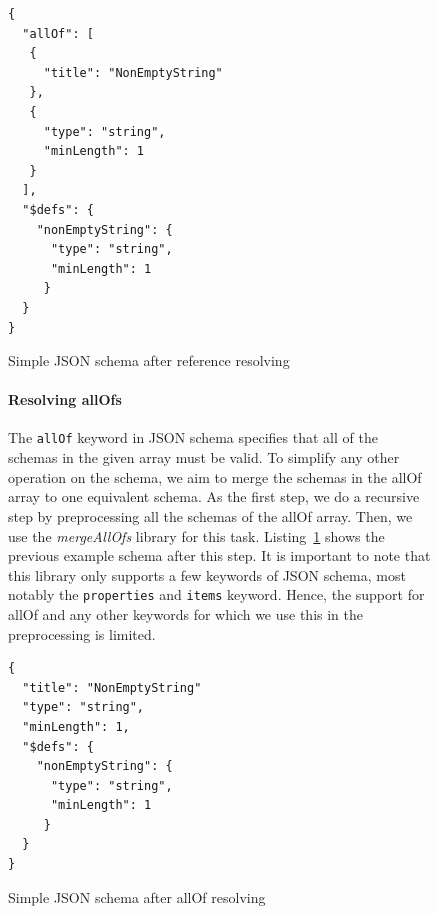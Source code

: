 \begin{figure}[h]
\begin{listing}[!h]
    \begin{verbatim}
{
  "allOf": [
   {
     "title": "NonEmptyString"
   },
   {
     "type": "string",
     "minLength": 1
   }
  ],
  "$defs": {
    "nonEmptyString": {
      "type": "string",
      "minLength": 1
     }
  }
}
    \end{verbatim}
    \caption{Simple JSON schema after reference resolving}
    \label{listing:reference-resolving}
\end{listing}

\paragraph{Resolving allOfs}

The \texttt{allOf} keyword in JSON schema specifies that all of the schemas in the given array must be valid.
To simplify any other operation on the schema, we aim to merge the schemas in the allOf array to one equivalent schema.
As the first step, we do a recursive step by preprocessing all the schemas of the allOf array.
Then, we use the \textit{mergeAllOfs} library %
for this task.
Listing~\ref{listing:resolved-allOf} shows the previous example schema after this step.
It is important to note that this library only supports a few keywords of JSON schema, most notably the
\texttt{properties} and \texttt{items} keyword.
Hence, the support for allOf and any other keywords for which we use this in the preprocessing is limited.

\begin{listing}[h]
    \begin{verbatim}
{
  "title": "NonEmptyString"
  "type": "string",
  "minLength": 1,
  "$defs": {
    "nonEmptyString": {
      "type": "string",
      "minLength": 1
     }
  }
}
    \end{verbatim}
    \caption{Simple JSON schema after allOf resolving}
    \label{listing:resolved-allOf}
\end{listing}



\end{figure}
